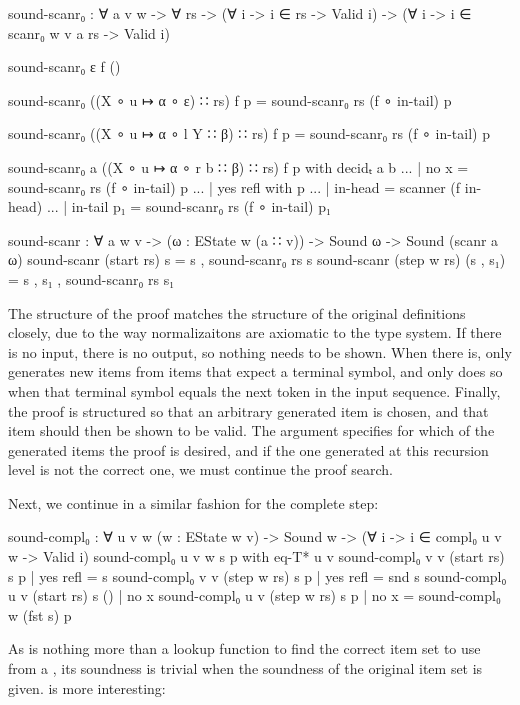 		\begin{code}
			sound-scanr₀ : ∀ {a v w} -> ∀ rs ->
			  (∀ {i} -> i ∈ rs -> Valid i) ->
			  (∀ {i} -> i ∈ scanr₀ {w} {v} a rs -> Valid i)

			sound-scanr₀ ε f ()

			sound-scanr₀ ((X ∘ u ↦ α ∘ ε) ∷ rs) f p = 
			  sound-scanr₀ rs (f ∘ in-tail) p

			sound-scanr₀ ((X ∘ u ↦ α ∘ l Y ∷ β) ∷ rs) f p = 
			  sound-scanr₀ rs (f ∘ in-tail) p

			sound-scanr₀ {a} ((X ∘ u ↦ α ∘ r b ∷ β) ∷ rs) f p with decidₜ a b
			... | no x = sound-scanr₀ rs (f ∘ in-tail) p
			... | yes refl with p
			...            | in-head    = scanner (f in-head)
			...            | in-tail p₁ = sound-scanr₀ rs (f ∘ in-tail) p₁

			sound-scanr : ∀ {a w v} -> (ω : EState w (a ∷ v)) ->
			  Sound ω -> Sound (scanr a ω)
			sound-scanr (start rs) s = s , sound-scanr₀ rs s
			sound-scanr (step w rs) (s , s₁) = s , s₁ , sound-scanr₀ rs s₁
		\end{code}

		The structure of the proof matches the structure of the original
		definitions closely, due to the way normalizaitons are axiomatic to the
		type system. If there is no input, there is no output, so nothing needs
		to be shown. When there is,  only generates new items
		from items that expect a terminal symbol, and only does so when that
		terminal symbol equals the next token in the input sequence. Finally,
		the proof is structured so that an arbitrary generated item is chosen,
		and that item should then be shown to be valid. The argument 
		specifies for which of the generated items the proof is desired, and if
		the one generated at this recursion level is not the correct one, we
		must continue the proof search.

		Next, we continue in a similar fashion for the complete step:

		\begin{code}
			sound-compl₀ : ∀ {u v w} (w : EState w v) ->
			  Sound w -> (∀ {i} -> i ∈ compl₀ {u} {v} w -> Valid i)
			sound-compl₀ {u} {v} w s p           with eq-T* u v
			sound-compl₀ {v} {v} (start rs) s p  | yes refl = s
			sound-compl₀ {v} {v} (step w rs) s p | yes refl = snd s
			sound-compl₀ {u} {v} (start rs) s () | no x
			sound-compl₀ {u} {v} (step w rs) s p | no x = sound-compl₀ w (fst s) p
		\end{code}

		As  is nothing more than a lookup function to find
		the correct item set to use from a , its soundness is
		trivial when the soundness of the original item set is given.
		 is more interesting:

